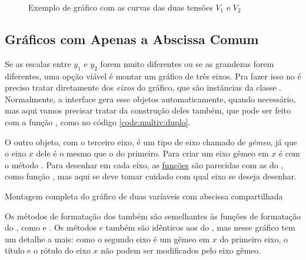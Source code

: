     \begin{figure}[htbp]
        \centering
        

        \caption{Exemplo de gráfico com as curvas das duas tensões $V_1$ e $V_2$}
        \label{fig:multiv:juntos}
    \end{figure}


\subsection{Gráficos com Apenas a Abscissa Comum}

    Se as escalas entre $y_1$ e $y_2$ forem muito diferentes ou se as grandezas forem diferentes, uma opção viável é montar um gráfico de três eixos. Pra fazer isso no \matplotlib é preciso tratar diretamente dos \emph{eixos} do gráfico, que são instâncias da classe . Normalmente, a interface \pyplot gera esse objetos automaticamente, quando necessário, mas aqui vamos precisar tratar da construção deles também, que pode ser feito com a função , como no código \ref{code:multiv:duplo}.

    O outro objeto, com o terceiro eixo, é um tipo de eixo chamado de \emph{gêmeo}, já que o eixo $x$ dele é o mesmo que o do primeiro. Para criar um eixo gêmeo em $x$ é com o método . Para desenhar em cada eixo, as \href{https://matplotlib.org/3.1.0/api/axes_api.html\#plotting}{funções} são parecidas com as do \pyplot, como função , mas aqui se deve tomar cuidado com qual eixo se deseja desenhar.

    \begin{listing}[H]
        \caption{Montagem completa do gráfico de duas varíaveis com abscissa compartilhada}
        \label{code:multiv:duplo}

    \end{listing}

    Os métodos de formatação dos  também são semelhantes às funções de formatação do \pyplot, como  e . Os métodos  e  também são idênticos aos do \pyplot, mas nesse gráfico tem um detalhe a mais: como o segundo eixo é um gêmeo em $x$ do primeiro eixo, o título e o rótulo do eixo $x$ não podem ser modificados pelo eixo gêmeo.

